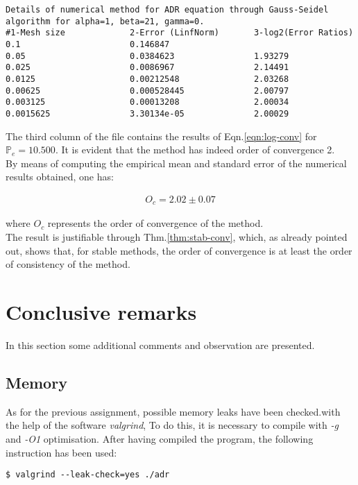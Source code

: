 \documentclass[11pt]{article}
\theoremstyle{theorem}
\theoremstyle{definition}
\begin{document}
  
\begin{lstlisting}
Details of numerical method for ADR equation through Gauss-Seidel algorithm for alpha=1, beta=21, gamma=0.
#1-Mesh size             2-Error (LinfNorm)       3-log2(Error Ratios)     
0.1                      0.146847                 	                        
0.05                     0.0384623                1.93279                  
0.025                    0.0086967                2.14491                  
0.0125                   0.00212548               2.03268                  
0.00625                  0.000528445              2.00797                  
0.003125                 0.00013208               2.00034                  
0.0015625                3.30134e-05              2.00029 
\end{lstlisting}


The third column of the file contains the results of Eqn.\eqref{eqn:log-conv} for $\mathbb{P}_e=10.500$. It is evident that the method has indeed order of convergence 2.\\
By means of computing the empirical mean and standard error of the numerical results obtained, one has:

\begin{align}
	\label{eqn:order-of-convergence}
	O_c = 2.02 \pm 0.07
\end{align} 

where $O_c$ represents the order of convergence of the method.\\
The result is justifiable through Thm.\ref{thm:stab-conv}, which, as already pointed out, shows that, for stable methods, the order of convergence is at least the order of consistency of the method.

\section{Conclusive remarks}
In this section some additional comments and observation are presented.

\subsection{Memory}
As for the previous assignment, possible memory leaks have been checked.with the help of the software \emph{valgrind}, To do this, it is necessary to compile with \emph{-g} and \emph{-O1} optimisation. After having compiled the program, the following instruction has been used:


\begin{lstlisting}
$ valgrind --leak-check=yes ./adr
\end{lstlisting}
\end{document}
